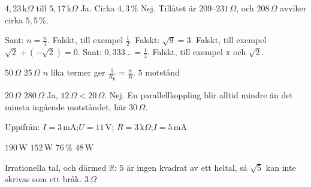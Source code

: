 \begin{facit}
  $4{,}23\,\text{k}\Omega$ till $5{,}17\,\text{k}\Omega$  Ja.
 Cirka $4{,}3\,\%$
 Nej. Tillåtet är $209$--$231\,\Omega$, och $208\,\Omega$ avviker cirka $5{,}5\,\%$.

  Sant: $n = \frac{n}{1}$.
 Falskt, till exempel $\frac{1}{2}$.
 Falskt: $\sqrt{9} = 3$.
 Falskt, till exempel $\sqrt{2} + (-\sqrt{2}) = 0$.
 Sant: $0{,}333\ldots = \frac{1}{3}$.
 Falskt, till exempel $\pi$ och $\sqrt{2}$.

  $50\,\Omega$  $25\,\Omega$
 $n$ lika termer ger $\frac{1}{R_{\text{p}}} = \frac{n}{R}$.
 $5$ motstånd

  $20\,\Omega$  $280\,\Omega$  Ja, $12\,\Omega < 20\,\Omega$.
 Nej. En parallellkoppling blir alltid mindre än det minsta ingående motståndet, här
$30\,\Omega$.

 Uppifrån: $I = 3\,\text{mA}$;\enspace $U = 11\,\text{V}$;\enspace
$R = 3\,\text{k}\Omega$;\enspace $I = 5\,\text{mA}$

  $190\,\text{W}$  $152\,\text{W}$  $76\,\%$  $48\,\text{W}$

  Irrationella tal, och därmed $\mathbb{R}$: $5$ är ingen
kvadrat av ett heltal, så $\sqrt{5}$ kan inte skrivas som ett bråk.
 $3\,\Omega$

\end{facit}
